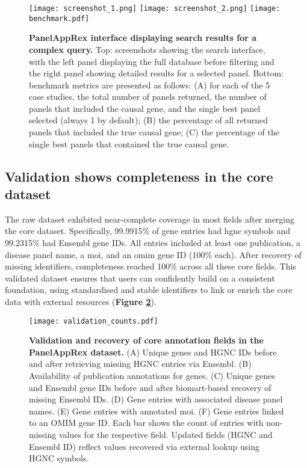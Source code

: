 \begin{figure}[ht]
    \centering
    \texttt{[image: screenshot\_1.png]}
    \texttt{[image: screenshot\_2.png]}    
    \texttt{[image: benchmark.pdf]}    
\caption{\textbf{PanelAppRex interface displaying search results for a complex query.} Top: screenshots showing the search interface, with the left panel displaying the full database before filtering and the right panel showing detailed results for a selected panel. Bottom: benchmark metrics are presented as follows: (A) for each of the 5 case studies, the total number of panels returned, the number of panels that included the causal gene, and the single best panel selected (always 1 by default); (B) the percentage of all returned panels that included the true causal gene; (C) the percentage of the single best panels that contained the true causal gene.}
    \label{fig:performance}
\end{figure}

\subsection{Validation shows completeness in the core dataset}
\noindent
The raw dataset exhibited near-complete coverage in most fields after merging the core dataset. 
Specifically, 99.9915\% of gene entries had \ac{hgnc} symbols %
and 99.2315\% had Ensembl gene IDs. %
All entries included at least one publication, a disease panel name, a \ac{moi}, and an \ac{omim} gene ID (100\% each). 
After recovery of missing identifiers, completeness reached 100\% across all these core fields.
This validated dataset ensures that users can confidently build on a consistent foundation, using standardised and stable identifiers to link or enrich the core data with external resources (\textbf{Figure \ref{fig:validation}}).

\begin{figure}[ht]
    \centering
    \texttt{[image: validation\_counts.pdf]}
\caption{\textbf{Validation and recovery of core annotation fields in the PanelAppRex dataset.}
(A) Unique genes and HGNC IDs before and after retrieving missing HGNC entries via Ensembl.
(B) Availability of publication annotations for genes.
(C) Unique genes and Ensembl gene IDs before and after biomart-based recovery of missing Ensembl IDs.
(D) Gene entries with associated disease panel names.
(E) Gene entries with annotated \ac{moi}.
(F) Gene entries linked to an OMIM gene ID.
Each bar shows the count of entries with non-missing values for the respective field. Updated fields (HGNC and Ensembl ID) reflect values recovered via external lookup using HGNC symbols.
}
    \label{fig:validation}
\end{figure}

